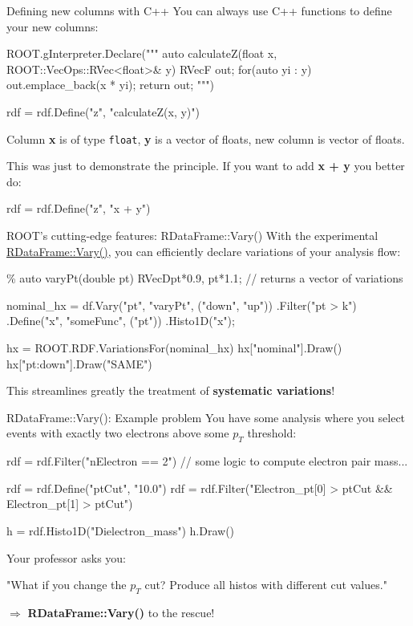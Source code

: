 \documentclass[aspectratio=169]{beamer}
\newcommand{\myhref}[2]{{\color{blue}\href{#1}{\underline{#2}}}}
\begin{document}
\begin{frame}[fragile]{Defining new columns with C++}
You can always use C++ functions to define your new columns:
\begin{pycell}
ROOT.gInterpreter.Declare("""
auto calculateZ(float x, ROOT::VecOps::RVec<float>& y) {
    RVecF out;
    for(auto yi : y) {
        out.emplace_back(x * yi);
    }
    return out;
}
""")

rdf = rdf.Define("z", "calculateZ(x, y)")
\end{pycell}
Column \textbf{x} is of type \texttt{float}, \textbf{y} is a vector of floats, new column is vector of floats.

    This was just to demonstrate the principle. If you want to add \textbf{x + y} you better do:
\begin{pycell}
rdf = rdf.Define("z", "x + y")
\end{pycell}
\end{frame}

\begin{frame}[fragile]{ROOT's cutting-edge features: RDataFrame::Vary()}
    With the experimental \myhref{https://root.cern/doc/master/classROOT_1_1RDF_1_1RInterface.html\#a84d15369c945e4fe85e919224a0fc99f}{RDataFrame::Vary()}, you can efficiently declare variations of your analysis flow:
\begin{cppcell}
\%%
auto varyPt(double pt) {
    RVecD{pt*0.9, pt*1.1}; // returns a vector of variations
}
\end{cppcell}
\begin{pycell}
nominal_hx = df.Vary("pt", "varyPt", ("down", "up"))
      .Filter("pt > k")
      .Define("x", "someFunc", ("pt"))
      .Histo1D("x");
 
hx = ROOT.RDF.VariationsFor(nominal_hx)
hx["nominal"].Draw()
hx["pt:down"].Draw("SAME")
\end{pycell}
This streamlines greatly the treatment of \textbf{systematic variations}!
\end{frame}

\begin{frame}[fragile]{RDataFrame::Vary(): Example problem}
You have some analysis where you select events with exactly two electrons above some $p_T$ threshold:
\begin{pycell}
rdf = rdf.Filter("nElectron == 2")
// some logic to compute electron pair mass...

rdf = rdf.Define("ptCut", "10.0")
rdf = rdf.Filter("Electron_pt[0] > ptCut && Electron_pt[1] > ptCut")

h = rdf.Histo1D("Dielectron_mass")
h.Draw()
\end{pycell}
Your professor asks you:

\begin{center}
    "What if you change the $p_T$ cut? Produce all histos with different cut values."
\end{center}

\vspace{5mm}

$\Rightarrow$ \textbf{RDataFrame::Vary()} to the rescue!
\end{frame}
\end{document}
